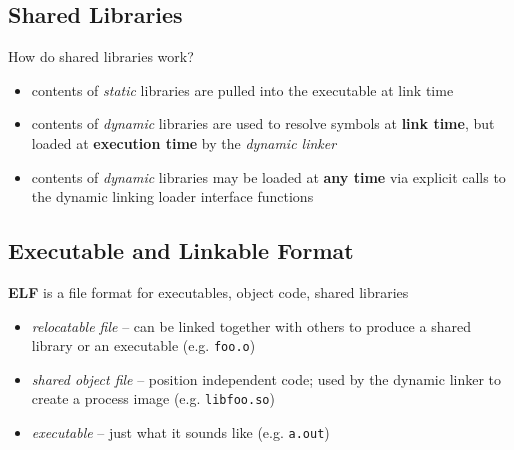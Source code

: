 \documentclass[xga]{xdvislides}
\begin{document}
\subsection{Shared Libraries}
How do shared libraries work?
\begin{itemize}
	\item contents of {\em static} libraries are pulled into the
		executable at link time
	\item contents of {\em dynamic} libraries are used to resolve
		symbols at {\bf link time}, but loaded at {\bf execution time} by the
		{\em dynamic linker}
	\item contents of {\em dynamic} libraries may be loaded at {\bf any
		time} via explicit calls to the dynamic linking loader interface
		functions
\end{itemize}

\subsection{Executable and Linkable Format}

{\bf ELF} is a file format for executables, object code, shared libraries

\begin{itemize}
	\item {\em relocatable file} -- can be linked
		together with others to produce a
		shared library or an executable (e.g. \verb+foo.o+)
	\item {\em shared object file} -- position
		independent code; used by the dynamic
		linker to create a process image (e.g. \verb+libfoo.so+)
	\item {\em executable} -- just what it sounds like (e.g. \verb+a.out+)
\end{itemize}
\end{document}

